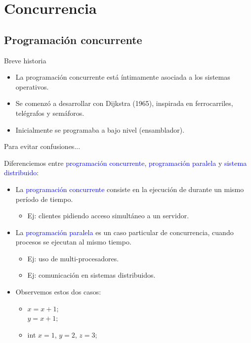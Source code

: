 \documentclass[handout]{beamer} %
\newcommand{\blue}[1]{\textcolor{blue}{#1}}
\newcommand{\redb}[1]{{\color{red!70!black}{#1}}}
\begin{document}

\section{Concurrencia}

\subsection{Programación concurrente}

\begin{frame}{Breve historia}
  \begin{itemize}
    \item La programación concurrente está íntimamente asociada a los sistemas operativos.
    \item Se comenzó a desarrollar con Dijkstra (1965), inspirada en ferrocarriles, telégrafos y semáforos.
    \item Inicialmente se programaba a bajo nivel (ensamblador).
  \end{itemize}
\end{frame}

\begin{frame}{Para evitar confusiones...}

  Diferenciemos entre \blue{programación concurrente}, \blue{programación paralela} y \blue{sistema distribuido}:
  \begin{itemize}
    \item<2-> La \blue{programación concurrente} consiste en la ejecución de \redb{múltiples procesos} durante un mismo período de tiempo.
    \begin{itemize}
        \item Ej: clientes pidiendo acceso simultáneo a un servidor.
    \end{itemize}
    \item<3-> La \blue{programación paralela} es un caso particular de concurrencia, cuando procesos se ejecutan al mismo tiempo.
    \begin{itemize}
        \item Ej: uso de multi-procesadores.
        \item Ej: comunicación en sistemas distribuidos.
    \end{itemize}
    \item<4-> Observemos estos dos casos:
    \begin{itemize}
        \item $x=x+1;$\\$y=x+1;$
        \item int $x=1$, $y=2$, $z=3$;
    \end{itemize}
  \end{itemize}
\end{frame}
\end{document}
